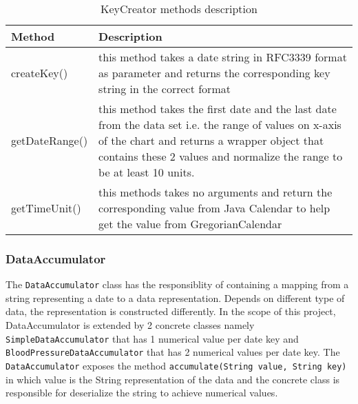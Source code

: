 
\begin{table}[h]
\begin{center}
    \begin{tabular}{| l | p{12cm} |}
        \hline Method & Description \\
        \hline createKey() & 
            this method takes a date string in RFC3339 format as parameter and returns the corresponding key string in
            the correct format \\
        \hline getDateRange() &
            this method takes the first date and the last date from the data set i.e. the range of values on x-axis of
            the chart and returns a wrapper object that contains these 2 values and normalize the range to be at least
            10 units. \\
        \hline getTimeUnit() &
            this methods takes no arguments and return the corresponding value from Java Calendar to help get the value
            from GregorianCalendar \\
        \hline
    \end{tabular}
    \caption{KeyCreator methods description}
\end{center}
\end{table}

\subsubsection{DataAccumulator}
The \texttt{DataAccumulator} class has the responsiblity of containing a mapping from a string representing a date to a
data representation. Depends on different type of data, the representation is constructed differently. In the scope of
this project, DataAccumulator is extended by 2 concrete classes namely \texttt{SimpleDataAccumulator} that has 1
numerical value per date key and \texttt{BloodPressureDataAccumulator} that has 2 numerical values per date key. The
\texttt{DataAccumulator} exposes the method \texttt{accumulate(String value, String key)} in which value is the String
representation of the data and the concrete class is responsible for deserialize the string to achieve numerical values.

